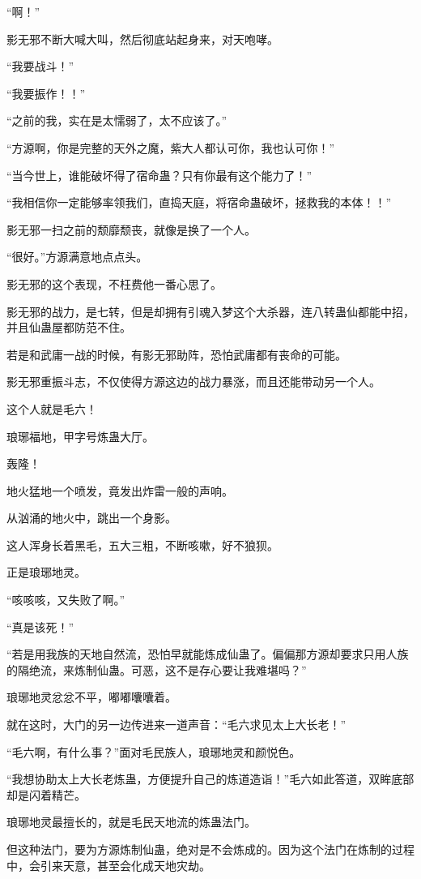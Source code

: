 \begin{this_body}
“啊！”

影无邪不断大喊大叫，然后彻底站起身来，对天咆哮。

“我要战斗！”

“我要振作！！”

“之前的我，实在是太懦弱了，太不应该了。”

“方源啊，你是完整的天外之魔，紫大人都认可你，我也认可你！”

“当今世上，谁能破坏得了宿命蛊？只有你最有这个能力了！”

“我相信你一定能够率领我们，直捣天庭，将宿命蛊破坏，拯救我的本体！！”

影无邪一扫之前的颓靡颓丧，就像是换了一个人。

“很好。”方源满意地点点头。

影无邪的这个表现，不枉费他一番心思了。

影无邪的战力，是七转，但是却拥有引魂入梦这个大杀器，连八转蛊仙都能中招，并且仙蛊屋都防范不住。

若是和武庸一战的时候，有影无邪助阵，恐怕武庸都有丧命的可能。

影无邪重振斗志，不仅使得方源这边的战力暴涨，而且还能带动另一个人。

这个人就是毛六！

琅琊福地，甲字号炼蛊大厅。

轰隆！

地火猛地一个喷发，竟发出炸雷一般的声响。

从汹涌的地火中，跳出一个身影。

这人浑身长着黑毛，五大三粗，不断咳嗽，好不狼狈。

正是琅琊地灵。

“咳咳咳，又失败了啊。”

“真是该死！”

“若是用我族的天地自然流，恐怕早就能炼成仙蛊了。偏偏那方源却要求只用人族的隔绝流，来炼制仙蛊。可恶，这不是存心要让我难堪吗？”

琅琊地灵忿忿不平，嘟嘟囔囔着。

就在这时，大门的另一边传进来一道声音：“毛六求见太上大长老！”

“毛六啊，有什么事？”面对毛民族人，琅琊地灵和颜悦色。

“我想协助太上大长老炼蛊，方便提升自己的炼道造诣！”毛六如此答道，双眸底部却是闪着精芒。

琅琊地灵最擅长的，就是毛民天地流的炼蛊法门。

但这种法门，要为方源炼制仙蛊，绝对是不会炼成的。因为这个法门在炼制的过程中，会引来天意，甚至会化成天地灾劫。


\end{this_body}
